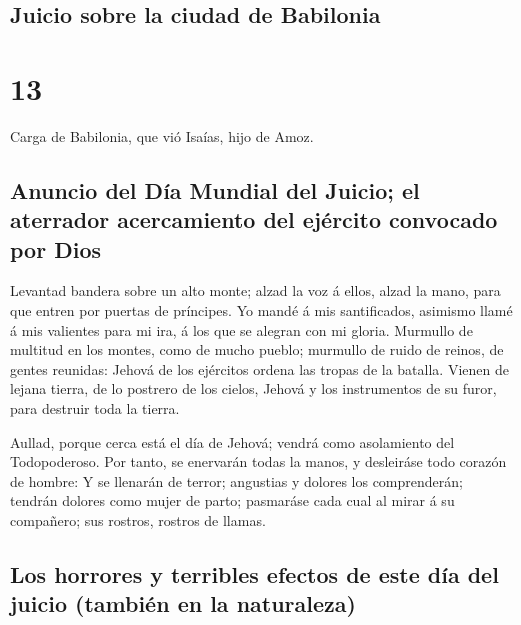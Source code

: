 \hypertarget{juicio-sobre-la-ciudad-de-babilonia}{%
\subsection{Juicio sobre la ciudad de
Babilonia}\label{juicio-sobre-la-ciudad-de-babilonia}}

\hypertarget{section-23-13}{%
\section{13}\label{section-23-13}}

 Carga de Babilonia, que vió Isaías, hijo de Amoz.

\hypertarget{anuncio-del-duxeda-mundial-del-juicio-el-aterrador-acercamiento-del-ejuxe9rcito-convocado-por-dios}{%
\subsection{Anuncio del Día Mundial del Juicio; el aterrador
acercamiento del ejército convocado por
Dios}\label{anuncio-del-duxeda-mundial-del-juicio-el-aterrador-acercamiento-del-ejuxe9rcito-convocado-por-dios}}

 Levantad bandera sobre un alto monte; alzad la voz á
ellos, alzad la mano, para que entren por puertas de príncipes.
 Yo mandé á mis santificados, asimismo llamé á mis
valientes para mi ira, á los que se alegran con mi gloria.
 Murmullo de multitud en los montes, como de mucho pueblo;
murmullo de ruido de reinos, de gentes reunidas: Jehová de los ejércitos
ordena las tropas de la batalla.  Vienen de lejana tierra,
de lo postrero de los cielos, Jehová y los instrumentos de su furor,
para destruir toda la tierra.

 Aullad, porque cerca está el día de Jehová; vendrá como
asolamiento del Todopoderoso.  Por tanto, se enervarán
todas la manos, y desleiráse todo corazón de hombre:  Y se
llenarán de terror; angustias y dolores los comprenderán; tendrán
dolores como mujer de parto; pasmaráse cada cual al mirar á su
compañero; sus rostros, rostros de llamas.

\hypertarget{los-horrores-y-terribles-efectos-de-este-duxeda-del-juicio-tambiuxe9n-en-la-naturaleza}{%
\subsection{Los horrores y terribles efectos de este día del juicio
(también en la
naturaleza)}\label{los-horrores-y-terribles-efectos-de-este-duxeda-del-juicio-tambiuxe9n-en-la-naturaleza}}

